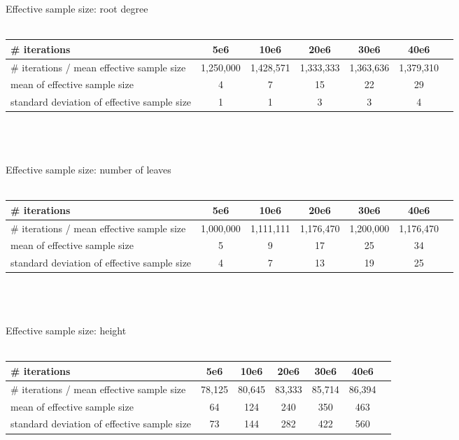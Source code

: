 \documentclass{article}
\begin{document}
{\Large Effective sample size: root degree}	\\
\\
\begin{tabular}{| l | c | c |c | c | c | c |}
	\hline
	\# iterations&5e6&10e6&20e6&30e6&40e6 \\ \hline
	\# iterations / mean effective sample size&1,250,000&1,428,571&1,333,333&1,363,636&1,379,310 \\
	mean of effective sample size&4&7&15&22&29\\
	standard deviation of effective sample size&1&1&3&3&4\\
	\hline
\end{tabular}
\\
\\
\\

{\Large Effective sample size: number of leaves} \\
\\
\begin{tabular}{| l | c | c |c | c | c | c |}	
	\hline
	\# iterations&5e6&10e6&20e6&30e6&40e6 \\ \hline
	\# iterations / mean effective sample size&1,000,000&1,111,111&1,176,470&1,200,000&1,176,470 \\
	mean of effective sample size&5&9&17&25&34\\
	standard deviation of effective sample size&4&7&13&19&25\\
	\hline
\end{tabular}
\\
\\
\\

{\Large Effective sample size: height}	\\
\\
\begin{tabular}{| l | c | c |c | c | c | c |}
	\hline
	\# iterations&5e6&10e6&20e6&30e6&40e6 \\ \hline
	\# iterations / mean effective sample size&78,125&80,645&83,333&85,714&86,394 \\
	mean of effective sample size&64&124&240&350&463\\
	standard deviation of effective sample size&73&144&282&422&560\\
	\hline
\end{tabular}
\end{document}
